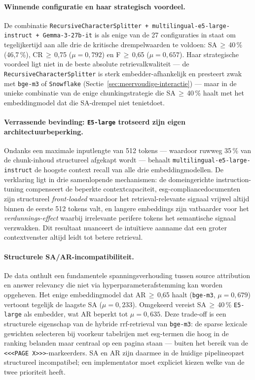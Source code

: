 \paragraph{Winnende configuratie en haar strategisch voordeel.}
De combinatie \texttt{RecursiveCharacterSplitter + multilingual-e5-large-instruct + Gemma-3-27b-it} is als enige van de 27 configuraties in staat om tegelijkertijd aan alle drie de kritische drempelwaarden te voldoen: SA\,$\geq$\,40\,\% (46{,}7\,\%), CR\,$\geq$\,0{,}75 ($\mu = 0{,}792$) en F\,$\geq$\,0{,}65 ($\mu = 0{,}657$). Haar strategische voordeel ligt niet in de beste absolute retrievalkwaliteit — de \texttt{RecursiveCharacterSplitter} is sterk embedder-afhankelijk en presteert zwak met \texttt{bge-m3} of \texttt{Snowflake} (Sectie~\ref{sec:meervoudige-interactie}) — maar in de unieke combinatie van de enige chunkingstrategie die SA\,$\geq$\,40\,\% haalt met het embeddingmodel dat die SA-drempel niet tenietdoet.

\paragraph{Verrassende bevinding: \texttt{E5-large} trotseerd zijn eigen architectuurbeperking.}
Ondanks een maximale inputlengte van 512 tokens — waardoor ruwweg 35\,\% van de chunk-inhoud structureel afgekapt wordt — behaalt \texttt{multilingual-e5-large-instruct} de hoogste context recall van alle drie embeddingmodellen. De verklaring ligt in drie samenlopende mechanismen: de domeingerichte instruction-tuning compenseert de beperkte contextcapaciteit, \gls{esg}-compliancedocumenten zijn structureel \textit{front-loaded} waardoor het retrieval-relevante signaal vrijwel altijd binnen de eerste 512 tokens valt, en langere embeddings zijn vatbaarder voor het \textit{verdunnings-effect} waarbij irrelevante perifere tokens het semantische signaal verzwakken. Dit resultaat nuanceert de intuïtieve aanname dat een groter contextvenster altijd leidt tot betere retrieval.

\paragraph{Structurele SA/AR-incompatibiliteit.}
De data onthult een fundamentele spanningsverhouding tussen source attribution en answer relevancy die niet via hyperparameterafstemming kan worden opgeheven. Het enige embeddingmodel dat AR\,$\geq$\,0{,}65 haalt (\texttt{bge-m3}, $\mu = 0{,}679$) vertoont tegelijk de laagste SA ($\mu = 0{,}233$). Omgekeerd vereist SA\,$\geq$\,40\,\% \texttt{E5-large} als embedder, wat AR beperkt tot $\mu = 0{,}635$. Deze trade-off is een structurele eigenschap van de hybride \gls{rrf}-retrieval van \texttt{bge-m3}: de sparse lexicale gewichten selecteren bij voorkeur tabelrijen met \gls{esg}-termen die hoog in de ranking belanden maar centraal op een pagina staan — buiten het bereik van de \texttt{<<<PAGE~X>>>}-markeerders. SA en AR zijn daarmee in de huidige pipelineopzet structureel incompatibel; een implementator moet expliciet kiezen welke van de twee prioriteit heeft.

